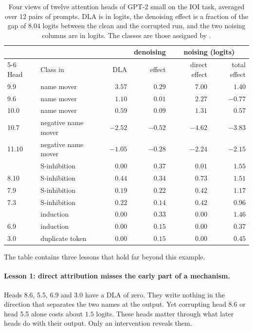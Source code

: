 \begin{table}[t]
\centering\small
\begin{tabular}{@{}llrrrr@{}}
\toprule
 & & & denoising & \multicolumn{2}{c}{noising (logits)} \\
\cmidrule(l){5-6}
Head & Class in \citet{wang2023interpretability} & DLA & effect & direct effect & total effect \\
\midrule
9.9 & name mover & $3.57$ & $0.29$ & $7.00$ & $1.40$ \\
9.6 & name mover & $1.10$ & $0.01$ & $2.27$ & $-0.77$ \\
10.0 & name mover & $0.59$ & $0.09$ & $1.31$ & $0.57$ \\
10.7 & negative name mover & $-2.52$ & $-0.52$ & $-4.62$ & $-3.83$ \\
11.10 & negative name mover & $-1.05$ & $-0.28$ & $-2.24$ & $-2.15$ \\
\addlinespace
8.6 & S-inhibition & $0.00$ & $0.37$ & $0.01$ & $1.55$ \\
8.10 & S-inhibition & $0.44$ & $0.34$ & $0.73$ & $1.51$ \\
7.9 & S-inhibition & $0.19$ & $0.22$ & $0.42$ & $1.17$ \\
7.3 & S-inhibition & $0.22$ & $0.14$ & $0.42$ & $0.96$ \\
\addlinespace
5.5 & induction & $0.00$ & $0.33$ & $0.00$ & $1.46$ \\
6.9 & induction & $0.00$ & $0.15$ & $0.00$ & $0.37$ \\
3.0 & duplicate token & $0.00$ & $0.15$ & $0.00$ & $0.45$ \\
\bottomrule
\end{tabular}
\caption{Four views of twelve attention heads of GPT-2 small on the IOI task, averaged over 12 pairs of prompts.
DLA is in logits, the denoising effect is a fraction of the gap of $8.04$ logits between the clean and the
corrupted run, and the two noising columns are in logits. The classes are those assigned by
\citet{wang2023interpretability}.}
\label{tab:heads}
\end{table}

The table contains three lessons that hold far beyond this example.

\paragraph{Lesson 1: direct attribution misses the early part of a mechanism.} Heads 8.6, 5.5, 6.9 and 3.0 have a
DLA of zero. They write nothing in the direction that separates the two names at the output. Yet corrupting head 8.6 or head 5.5 alone costs
about $1.5$ logits. These heads matter through what later heads do with their output. Only an intervention
reveals them.

